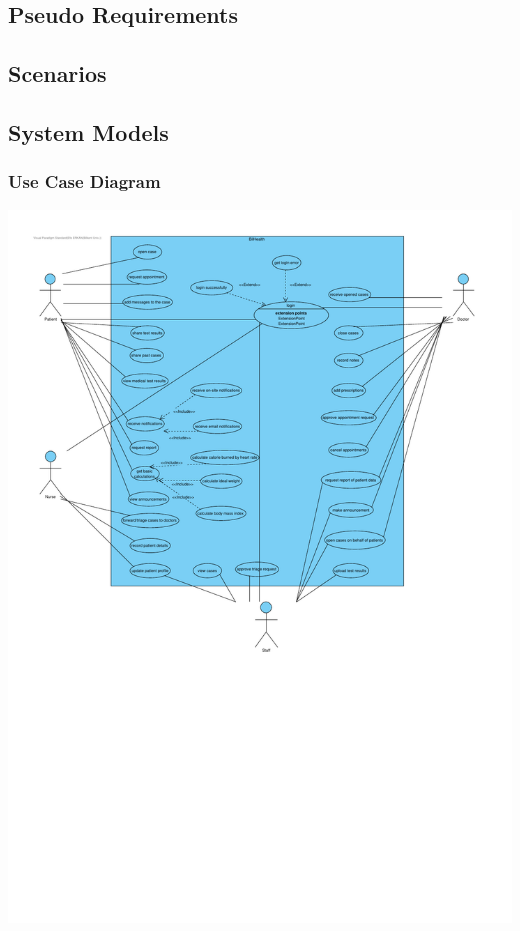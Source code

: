 \documentclass[a4paper, 12pt, titlepage]{article}
\begin{document}
  \subsection{Pseudo Requirements} %

  \subsection{Scenarios}

  \subsection{System Models}

  \pagebreak
  \subsubsection{Use Case Diagram}

  \includegraphics[width=\linewidth]{use_case_diag}
\end{document}
